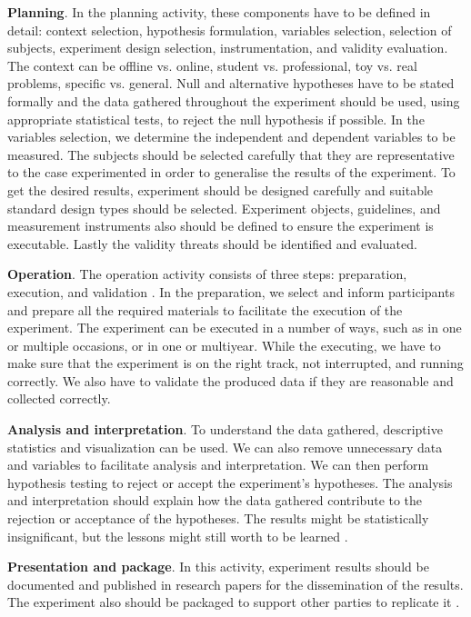 \textbf{Planning}. In the planning activity, these components have to be defined in detail: context selection, hypothesis formulation, variables selection, selection of subjects, experiment design selection, instrumentation, and validity evaluation\cite{DBLP:books/daglib/0029933/Wohlin}. The context can be offline vs. online, student vs. professional, toy vs. real problems, specific vs. general. Null and alternative hypotheses have to be stated formally and the data gathered throughout the experiment should be used, using appropriate statistical tests, to reject the null hypothesis if possible. In the variables selection, we determine the independent and dependent variables to be measured. The subjects should be selected carefully that they are representative to the case experimented in order to generalise the results of the experiment. To get the desired results, experiment should be designed carefully and suitable standard design types should be selected. Experiment objects, guidelines, and measurement instruments also should be defined to ensure the experiment is executable. Lastly the validity threats should be identified and evaluated.

\textbf{Operation}. The operation activity consists of three steps: preparation, execution, and validation \cite{DBLP:books/daglib/0029933/Wohlin}. 
In the preparation, we select and inform participants and prepare all the required materials to facilitate the execution of the experiment. The experiment can be executed in a number of ways, such as in one or multiple occasions, or in one or multiyear.  While the executing, we have to make sure that the experiment is on the right track, not interrupted, and running correctly. We also have to validate the produced data if they are reasonable and collected correctly. 

\textbf{Analysis and interpretation}.
To understand the data gathered, descriptive statistics and visualization can be used. We can also remove unnecessary data and variables to facilitate analysis and interpretation. We can then perform hypothesis testing to reject or accept the experiment's hypotheses. The analysis and interpretation should explain how the data gathered contribute to the rejection or acceptance of the hypotheses. The results might be statistically insignificant, but the lessons might still worth to be learned \cite{DBLP:books/daglib/0029933/Wohlin}. 

\textbf{Presentation and package}. In this activity, experiment results should be documented and published in research papers for the dissemination of the results. The experiment also should be packaged to support other parties to replicate it \cite{DBLP:books/daglib/0029933/Wohlin}. 
